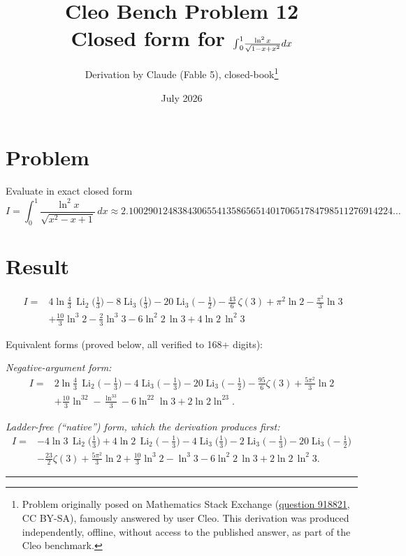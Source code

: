 \documentclass[11pt]{article}
\title{Cleo Bench Problem 12\\[1ex]\large Closed form for ${\large\int}_0^1\frac{\ln^2x}{\sqrt{1-x+x^2}}dx$}
\author{Derivation by Claude (Fable 5), closed-book\thanks{Problem originally
posed on Mathematics Stack Exchange
(\href{https://math.stackexchange.com/q/918821}{question 918821}, CC BY-SA),
famously answered by user Cleo. This derivation was produced independently,
offline, without access to the published answer, as part of the Cleo benchmark.}}
\date{July 2026}
\theoremstyle{remark}
\begin{document}
\maketitle

\section*{Problem}

Evaluate in exact closed form
\[
I=\int_0^1\frac{\ln^2x}{\sqrt{x^2-x+1}}\,dx \approx 2.100290124838430655413586565140170651784798511276914224\ldots
\]

\section*{Result}

\[
\boxed{\;
\begin{aligned}
I={}&4\ln\tfrac43\,\operatorname{Li}_2\!\Big(\tfrac13\Big)-8\operatorname{Li}_3\!\Big(\tfrac13\Big)-20\operatorname{Li}_3\!\Big(-\tfrac12\Big)
-\frac{43}{6}\,\zeta(3)+\pi^{2}\ln 2-\frac{\pi^{2}}{3}\ln 3\\
&+\frac{10}{3}\ln^{3}2-\frac{2}{3}\ln^{3}3-6\ln^{2}2\,\ln 3+4\ln 2\,\ln^{2}3\;
\end{aligned}}
\]

Equivalent forms (proved below, all verified to 168+ digits):

\textit{Negative-argument form:}
\[
\begin{aligned}
I={}&2\ln\tfrac43\,\operatorname{Li}_2\!\Big(-\tfrac13\Big)-4\operatorname{Li}_3\!\Big(-\tfrac13\Big)-20\operatorname{Li}_3\!\Big(-\tfrac12\Big)-\frac{95}{6}\zeta(3)+\frac{5\pi^2}{3}\ln2\\
&+\frac{10}{3}\ln^32-\frac{\ln^33}{3}-6\ln^22\ln3+2\ln2\ln^23 .
\end{aligned}
\]

\textit{Ladder-free (``native'') form, which the derivation produces first:}
\[
\begin{aligned}
I={}&-4\ln 3\,\operatorname{Li}_2\!\Big(\tfrac13\Big)+4\ln 2\,\operatorname{Li}_2\!\Big(-\tfrac13\Big)-4\operatorname{Li}_3\!\Big(\tfrac13\Big)-2\operatorname{Li}_3\!\Big(-\tfrac13\Big)-20\operatorname{Li}_3\!\Big(-\tfrac12\Big)\\
&-\frac{23}{2}\zeta(3)+\frac{5\pi^{2}}{3}\ln 2+\frac{10}{3}\ln^{3}2-\ln^{3}3-6\ln^{2}2\,\ln 3+2\ln 2\,\ln^{2}3 .
\end{aligned}
\]

\begin{center}\rule{0.5\textwidth}{0.4pt}\end{center}
\end{document}
